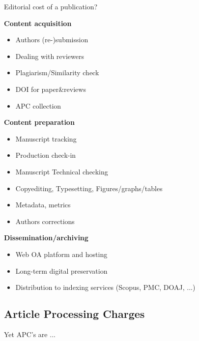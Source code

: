 \documentclass[10pt,compress,serif,aspectratio=169]{beamer}
\begin{document}
\begin{frame}[t]{Editorial cost of a publication?}
 \begin{minipage}{.45\textwidth}
   \textbf{Content acquisition}
   \begin{itemize}
   \item Authors (re-)submission
   \item Dealing with reviewers
   \item Plagiarism/Similarity check
   \item DOI for paper\&reviews
   \item APC collection
   \end{itemize}
 \end{minipage}
 \hfill
   \pause
 \begin{minipage}{.45\textwidth}
   \textbf{Content preparation}
   \begin{itemize}
   \item Manuscript tracking
   \item Production check-in
   \item Manuscript Technical checking
   \item Copyediting, Typesetting, Figures/graphs/tables
   \item Metadata, metrics
   \item Authors corrections
   \end{itemize}
\end{minipage}
\vfill
\pause
\begin{center}
 \begin{minipage}{.7\textwidth}
  \textbf{Dissemination/archiving}
  \begin{itemize}
  \item Web OA platform and hosting
  \item Long-term digital preservation
  \item Distribution to indexing services (Scopus, PMC, DOAJ, ...)
  \end{itemize}
\end{minipage}
\end{center}
\end{frame}


\subsection{Article Processing Charges}
\begin{frame}[t]%
 \vskip1cm%

 \begin{center}
 \alert{\Large Yet APC's are ...}\\
 \end{center}

 \pause
\end{frame}
\end{document}
